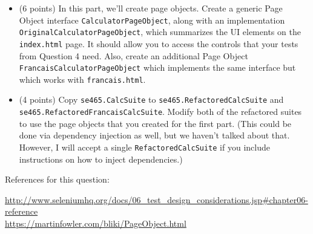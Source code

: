 \documentclass[10pt,hidelinks]{article}
\begin{document}
\begin{itemize}
\item (6 points) In this part, we'll create page objects. Create a generic Page Object interface {\tt CalculatorPageObject}, along with an implementation {\tt OriginalCalculatorPageObject}, which summarizes the UI elements on the {\tt index.html} page. It should allow you to access the controls that your tests from Question 4 need. Also, create an additional Page Object {\tt FrancaisCalculatorPageObject} which implements the same interface but which works with {\tt francais.html}. 
  \item (4 points) Copy {\tt se465.CalcSuite} to {\tt se465.RefactoredCalcSuite} and {\tt se465.RefactoredFrancaisCalcSuite}. Modify both of the refactored suites to use the page objects that you created for the first part. (This could be done via dependency injection as well, but we haven't talked about that. However, I will accept a single {\tt RefactoredCalcSuite} if you include instructions on how to inject dependencies.)
\end{itemize}

References for this question:

\url{http://www.seleniumhq.org/docs/06_test_design_considerations.jsp#chapter06-reference}
\\
\url{https://martinfowler.com/bliki/PageObject.html}
\end{document}
